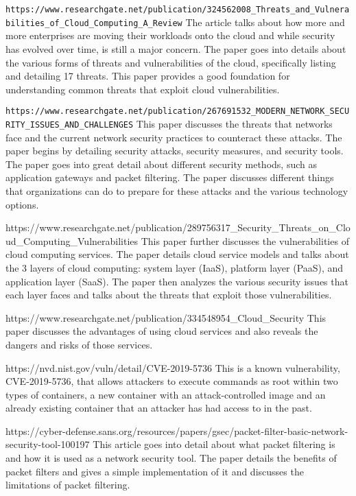\verb|https://www.researchgate.net/publication/324562008_Threats_and_Vulnerabilities_of_Cloud_Computing_A_Review|
The article talks about how more and more enterprises are moving their workloads onto the cloud and while
security has evolved over time, is still a major concern. The paper goes into details about the various forms
of threats and vulnerabilities of the cloud, specifically listing and detailing 17 threats. This paper
provides a good foundation for understanding common threats that exploit cloud vulnerabilities.

\verb|https://www.researchgate.net/publication/267691532_MODERN_NETWORK_SECURITY_ISSUES_AND_CHALLENGES|
This paper discusses the threats that networks face and the current network security practices to counteract these attacks.
The paper begins by detailing security attacks, security measures, and security tools. The paper goes into great detail about
different security methods, such as application gateways and packet filtering. The paper discusses different things that organizations
can do to prepare for these attacks and the various technology options.

https://www.researchgate.net/publication/289756317_Security_Threats_on_Cloud_Computing_Vulnerabilities
This paper further discusses the vulnerabilities of cloud computing services. The paper details cloud service models and talks about
the 3 layers of cloud computing: system layer (IaaS), platform layer (PaaS), and application layer (SaaS). The paper then analyzes
the various security issues that each layer faces and talks about the threats that exploit those vulnerabilities.

https://www.researchgate.net/publication/334548954_Cloud_Security
This paper discusses the advantages of using cloud services and also reveals the dangers and risks of those services.

https://nvd.nist.gov/vuln/detail/CVE-2019-5736
This is a known vulnerability, CVE-2019-5736, that allows attackers to execute commands as root within two types of containers,
a new container with an attack-controlled image and an already existing container that an attacker has had access to in the past.

https://cyber-defense.sans.org/resources/papers/gsec/packet-filter-basic-network-security-tool-100197
This article goes into detail about what packet filtering is and how it is used as a network security tool.
The paper details the benefits of packet filters and gives a simple implementation of it and discusses
the limitations of packet filtering.
